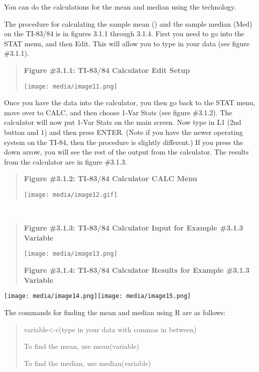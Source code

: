 \documentclass[]{book}
\begin{document}
You can do the calculations for the mean and median using the
technology.

The procedure for calculating the sample mean () and the sample median
(Med) on the TI-83/84 is in figures 3.1.1 through 3.1.4. First you need
to go into the STAT menu, and then Edit. This will allow you to type in
your data (see figure \#3.1.1).

\begin{quote}
\textbf{Figure \#3.1.1: TI-83/84 Calculator Edit Setup}

\texttt{[image: media/image11.png]}
\end{quote}

Once you have the data into the calculator, you then go back to the STAT
menu, move over to CALC, and then choose 1-Var Stats (see figure
\#3.1.2). The calculator will now put 1-Var Stats on the main screen.
Now type in L1 (2nd button and 1) and then press ENTER. (Note if you
have the newer operating system on the TI-84, then the procedure is
slightly different.) If you press the down arrow, you will see the rest
of the output from the calculator. The results from the calculator are
in figure \#3.1.3.

\begin{quote}
\textbf{Figure \#3.1.2: TI-83/84 Calculator CALC Menu}

\texttt{[image: media/image12.gif]}
\end{quote}

\textbf{\\
}

\begin{quote}
\textbf{Figure \#3.1.3: TI-83/84 Calculator Input for Example \#3.1.3
Variable}

\texttt{[image: media/image13.png]}

\textbf{Figure \#3.1.4: TI-83/84 Calculator Results for Example \#3.1.3
Variable}
\end{quote}

\texttt{[image: media/image14.png]}\texttt{[image: media/image15.png]}

The commands for finding the mean and median using R are as follows:

\begin{quote}
variable\textless{}-c(type in your data with commas in between)

To find the mean, use mean(variable)

To find the median, use median(variable)
\end{quote}
\end{document}
